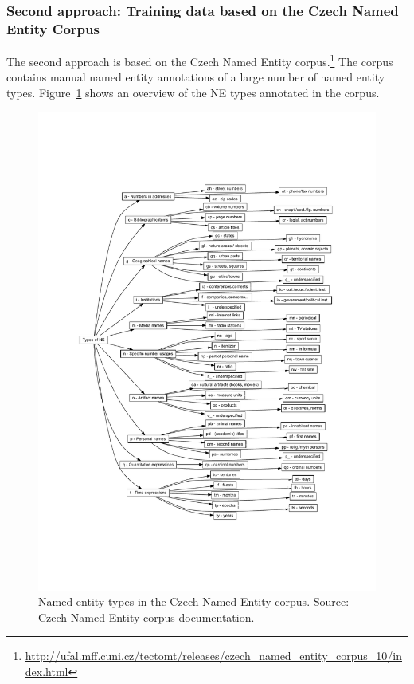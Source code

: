 \subsubsection*{Second approach: Training data based on the Czech Named Entity Corpus}

The second approach is based on the Czech Named Entity corpus.\footnote{\url{http://ufal.mff.cuni.cz/tectomt/releases/czech_named_entity_corpus_10/index.html}}
The corpus contains manual named entity annotations of a large number of named entity types. Figure~\ref{fig:figures_core_CzechNECorpus}
shows an overview of the NE types annotated in the corpus.


\begin{figure}
	\centering
		\includegraphics[width=16
		 cm]{figures/core/CzechNECorpus.pdf}
	\caption{Named entity types in the Czech Named Entity corpus. Source: Czech Named Entity corpus documentation.}
	\label{fig:figures_core_CzechNECorpus}
\end{figure}


